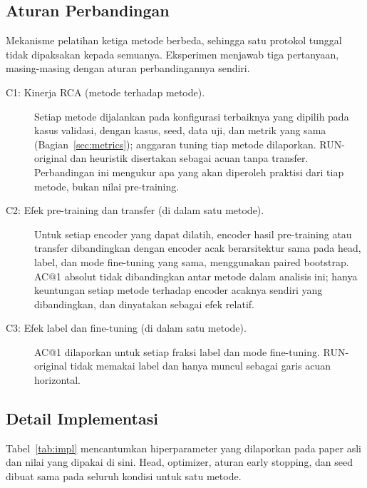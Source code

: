 \subsection{Aturan Perbandingan}\label{sec:fair}
Mekanisme pelatihan ketiga metode berbeda, sehingga satu protokol tunggal tidak dipaksakan kepada semuanya. Eksperimen menjawab tiga pertanyaan, masing-masing dengan aturan perbandingannya sendiri.
\begin{description}
\item[C1: Kinerja RCA (metode terhadap metode).] Setiap metode dijalankan pada konfigurasi terbaiknya yang dipilih pada kasus validasi, dengan kasus, seed, data uji, dan metrik yang sama (Bagian~\ref{sec:metrics}); anggaran tuning tiap metode dilaporkan. RUN-original dan heuristik disertakan sebagai acuan tanpa transfer. Perbandingan ini mengukur apa yang akan diperoleh praktisi dari tiap metode, bukan nilai pre-training.
\item[C2: Efek pre-training dan transfer (di dalam satu metode).] Untuk setiap encoder yang dapat dilatih, encoder hasil pre-training atau transfer dibandingkan dengan encoder acak berarsitektur sama pada head, label, dan mode fine-tuning yang sama, menggunakan paired bootstrap. AC@1 absolut tidak dibandingkan antar metode dalam analisis ini; hanya keuntungan setiap metode terhadap encoder acaknya sendiri yang dibandingkan, dan dinyatakan sebagai efek relatif.
\item[C3: Efek label dan fine-tuning (di dalam satu metode).] AC@1 dilaporkan untuk setiap fraksi label dan mode fine-tuning. RUN-original tidak memakai label dan hanya muncul sebagai garis acuan horizontal.
\end{description}

\subsection{Detail Implementasi}
Tabel~\ref{tab:impl} mencantumkan hiperparameter yang dilaporkan pada paper asli dan nilai yang dipakai di sini. Head, optimizer, aturan early stopping, dan seed dibuat sama pada seluruh kondisi untuk satu metode.

